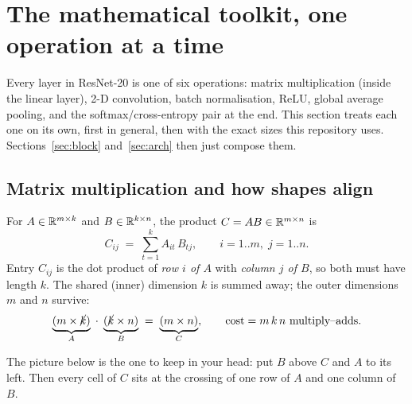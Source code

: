 \section{The mathematical toolkit, one operation at a time}
\label{sec:toolkit}

Every layer in ResNet-20 is one of six operations: matrix multiplication (inside the linear layer), 2-D convolution, batch normalisation, ReLU, global average pooling, and the softmax/cross-entropy pair at the end. This section treats each one on its own, first in general, then with the exact sizes this repository uses. Sections~\ref{sec:block} and~\ref{sec:arch} then just compose them.

\subsection{Matrix multiplication and how shapes align}
\label{sec:matmul}

\begin{idea}
For $A\in\mathbb{R}^{m\times k}$ and $B\in\mathbb{R}^{k\times n}$, the product $C=AB\in\mathbb{R}^{m\times n}$ is
\[
  C_{ij} \;=\; \sum_{t=1}^{k} A_{it}\,B_{tj}, \qquad i=1..m,\; j=1..n .
\]
Entry $C_{ij}$ is the dot product of \emph{row $i$ of $A$} with \emph{column $j$ of $B$}, so both must have length $k$. The shared (inner) dimension $k$ is summed away; the outer dimensions $m$ and $n$ survive:
\[
  \underbrace{(m\times \cancel{k})}_{A}\;\cdot\;\underbrace{(\cancel{k}\times n)}_{B}\;=\;\underbrace{(m\times n)}_{C},
  \qquad \text{cost} = m\,k\,n \text{ multiply--adds.}
\]
\end{idea}

The picture below is the one to keep in your head: put $B$ above $C$ and $A$ to its left. Then every cell of $C$ sits at the crossing of one row of $A$ and one column of $B$.

\begin{center}
\end{center}

